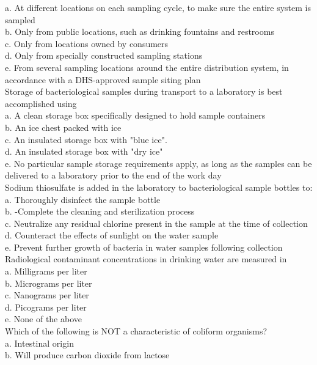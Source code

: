 a. At different locations on each sampling cycle, to make sure the entire system is sampled\\
b. Only from public locations, such as drinking fountains and restrooms\\
c. Only from locations owned by consumers\\
d. Only from specially constructed sampling stations\\
e. From several sampling locations around the entire distribution system, in accordance with a DHS-approved sample siting plan\\
Storage of bacteriological samples during transport to a laboratory is best accomplished using\\
a. A clean storage box specifically designed to hold sample containers\\
b. An ice chest packed with ice\\
c. An insulated storage box with "blue ice".\\
d. An insulated storage box with "dry ice"\\
e. No particular sample storage requirements apply, as long as the samples can be delivered to a laboratory prior to the end of the work day\\
  Sodium thiosulfate is added in the laboratory to bacteriological sample bottles to:\\
a. Thoroughly disinfect the sample bottle\\
b. -Complete the cleaning and sterilization process\\
c. Neutralize any residual chlorine present in the sample at the time of collection\\
d. Counteract the effects of sunlight on the water sample\\
e. Prevent further growth of bacteria in water samples following collection\\
  Radiological contaminant concentrations in drinking water are measured in\\
a. Milligrams per liter\\
b. Micrograms per liter\\
c. Nanograms per liter\\
d. Picograms per liter\\
e. None of the above\\
  Which of the following is NOT a characteristic of coliform organisms?\\
a. Intestinal origin\\
b. Will produce carbon dioxide from lactose\\
